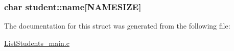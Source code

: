 \subsubsection[{\texorpdfstring{name}{name}}]{\setlength{\rightskip}{0pt plus 5cm}char student\+::name\mbox{[}{\bf N\+A\+M\+E\+S\+I\+ZE}\mbox{]}}\hypertarget{structstudent_a4cc31cdf611c0cce37bba9239ea27ae3}{}\label{structstudent_a4cc31cdf611c0cce37bba9239ea27ae3}


The documentation for this struct was generated from the following file\+:\begin{DoxyCompactItemize}
\item 
\hyperlink{ListStudents__main_8c}{List\+Students\+\_\+main.\+c}\end{DoxyCompactItemize}
